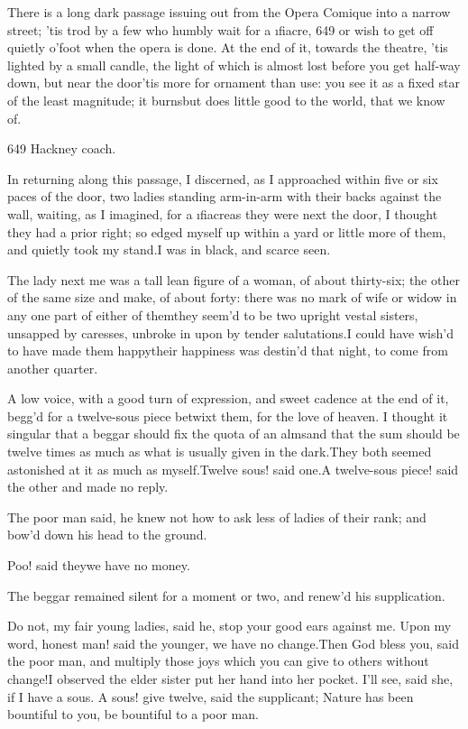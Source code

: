 \documentclass[twoside]{article}
\begin{document}
There is a long dark passage issuing out
from the Opera Comique into a narrow
street; ’tis trod by a few who humbly wait
for a \i{fiacre}, {649} or wish to get off
quietly o’foot when the opera is done.  At
the end of it, towards the theatre, ’tis
lighted by a small candle, the light of
which is almost lost before you get
half-way down, but near the door\tskk ’tis
more for ornament than use: you see it as
a fixed star of the least magnitude; it
burns\tskk but does little good to the
world, that we know of.

{649}  Hackney coach.

In returning along this passage, I
discerned, as I approached within five or
six paces of the door, two ladies standing
arm-in-arm with their backs against the
wall, waiting, as I imagined, for a
\i{fiacre}\tskk as they were next the
door, I thought they had a prior right; so
edged myself up within a yard or little
more of them, and quietly took my
stand.\tskk I was in black, and scarce
seen.

The lady next me was a tall lean figure of
a woman, of about thirty-six; the other of
the same size and make, of about forty:
there was no mark of wife or widow in any
one part of either of them\tskk they
seem’d to be two upright vestal sisters,
unsapped by caresses, unbroke in upon by
tender salutations.\tskk I could have
wish’d to have made them happy\tskk their
happiness was destin’d that night, to come
from another quarter.

A low voice, with a good turn of
expression, and sweet cadence at the end
of it, begg’d for a twelve-sous piece
betwixt them, for the love of heaven.  I
thought it singular that a beggar should
fix the quota of an alms\tskk and that the
sum should be twelve times as much as what
is usually given in the dark.\tskk They
both seemed astonished at it as much as
myself.\tskk Twelve sous! said one.\tskk A
twelve-sous piece! said the other\tskk
and made no reply.

The poor man said, he knew not how to ask
less of ladies of their rank; and bow’d
down his head to the ground.

Poo! said they\tskk we have no money.

The beggar remained silent for a moment or
two, and renew’d his supplication.

\tskk Do not, my fair young ladies, said
he, stop your good ears against me.\tskk
Upon my word, honest man! said the
younger, we have no change.\tskk Then God
bless you, said the poor man, and multiply
those joys which you can give to others
without change!\tskk I observed the elder
sister put her hand into her pocket.\tskk
I’ll see, said she, if I have a sous.  A
sous! give twelve, said the supplicant;
Nature has been bountiful to you, be
bountiful to a poor man.
\end{document}
